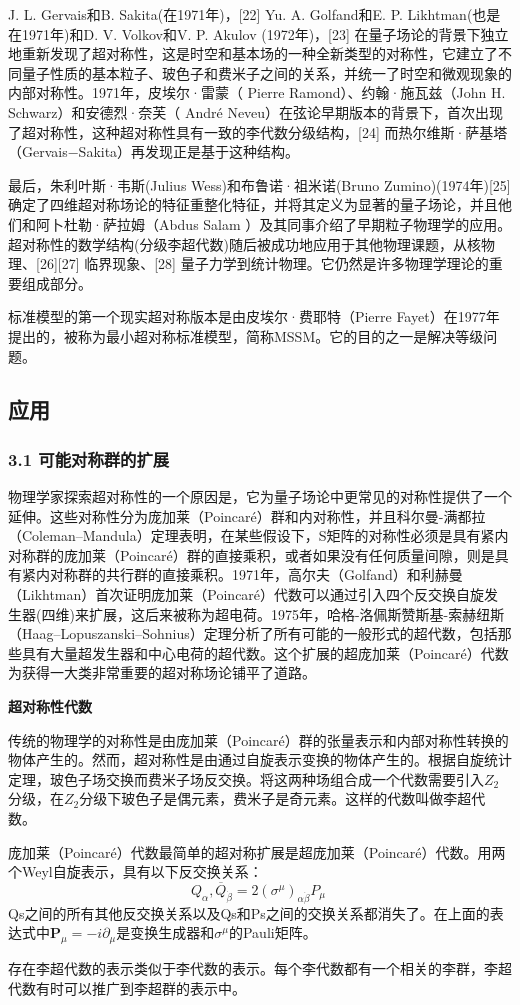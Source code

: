 J. L. Gervais和B. Sakita(在1971年)，[22] Yu. A. Golfand和E. P. Likhtman(也是在1971年)和D. V. Volkov和V. P. Akulov (1972年)，[23] 在量子场论的背景下独立地重新发现了超对称性，这是时空和基本场的一种全新类型的对称性，它建立了不同量子性质的基本粒子、玻色子和费米子之间的关系，并统一了时空和微观现象的内部对称性。1971年，皮埃尔·雷蒙（ Pierre Ramond）、约翰·施瓦兹（John H. Schwarz）和安德烈·奈芙（ André Neveu）在弦论早期版本的背景下，首次出现了超对称性，这种超对称性具有一致的李代数分级结构，[24] 而热尔维斯·萨基塔（Gervais−Sakita）再发现正是基于这种结构。

最后，朱利叶斯·韦斯(Julius Wess)和布鲁诺·祖米诺(Bruno Zumino)(1974年)[25] 确定了四维超对称场论的特征重整化特征，并将其定义为显著的量子场论，并且他们和阿卜杜勒·萨拉姆（Abdus Salam ）及其同事介绍了早期粒子物理学的应用。超对称性的数学结构(分级李超代数)随后被成功地应用于其他物理课题，从核物理、[26][27] 临界现象、[28] 量子力学到统计物理。它仍然是许多物理学理论的重要组成部分。

标准模型的第一个现实超对称版本是由皮埃尔·费耶特（Pierre Fayet）在1977年提出的，被称为最小超对称标准模型，简称MSSM。它的目的之一是解决等级问题。

\subsection{应用}
\subsubsection{3.1 可能对称群的扩展}
物理学家探索超对称性的一个原因是，它为量子场论中更常见的对称性提供了一个延伸。这些对称性分为庞加莱（Poincaré）群和内对称性，并且科尔曼-满都拉（Coleman–Mandula）定理表明，在某些假设下，S矩阵的对称性必须是具有紧内对称群的庞加莱（Poincaré）群的直接乘积，或者如果没有任何质量间隙，则是具有紧内对称群的共行群的直接乘积。1971年，高尔夫（Golfand）和利赫曼（Likhtman）首次证明庞加莱（Poincaré）代数可以通过引入四个反交换自旋发生器(四维)来扩展，这后来被称为超电荷。1975年，哈格-洛佩斯赞斯基-索赫纽斯（Haag–Lopuszanski–Sohnius）定理分析了所有可能的一般形式的超代数，包括那些具有大量超发生器和中心电荷的超代数。这个扩展的超庞加莱（Poincaré）代数为获得一大类非常重要的超对称场论铺平了道路。

\textbf{超对称性代数}

传统的物理学的对称性是由庞加莱（Poincaré）群的张量表示和内部对称性转换的物体产生的。然而，超对称性是由通过自旋表示变换的物体产生的。根据自旋统计定理，玻色子场交换而费米子场反交换。将这两种场组合成一个代数需要引入$Z_2$分级，在$Z_2$分级下玻色子是偶元素，费米子是奇元素。这样的代数叫做李超代数。

庞加莱（Poincaré）代数最简单的超对称扩展是超庞加莱（Poincaré）代数。用两个Weyl自旋表示，具有以下反交换关系：
$${Q_\alpha, \overline{Q}_{\dot{\beta}}} = 2 (\sigma^\mu)_{\alpha \dot{\beta}} P_\mu~$$
Qs之间的所有其他反交换关系以及Qs和Ps之间的交换关系都消失了。在上面的表达式中$\mathbf{P}_\mu = -i \partial_\mu$是变换生成器和$\sigma^\mu$的Pauli矩阵。

存在李超代数的表示类似于李代数的表示。每个李代数都有一个相关的李群，李超代数有时可以推广到李超群的表示中。
